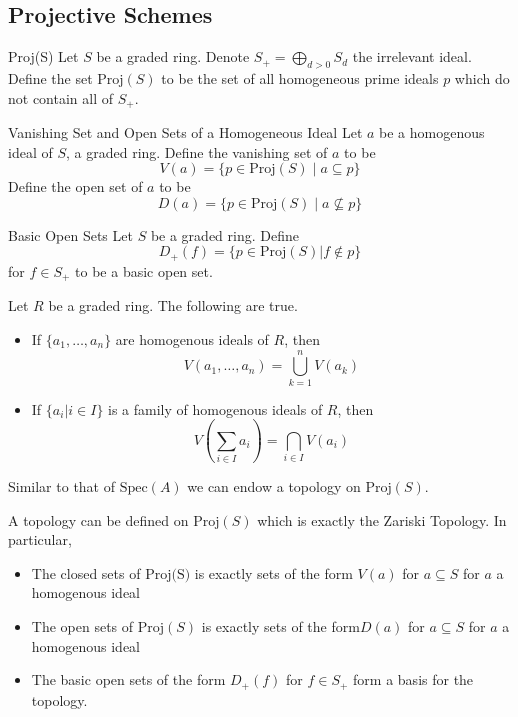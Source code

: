\documentclass[a4paper]{article}
\begin{document}
\subsection{Projective Schemes}
\begin{defn}{Proj(S)}{} Let $S$ be a graded ring. Denote $S_+=\bigoplus_{d>0}S_d$ the irrelevant ideal. Define the set $\text{Proj}(S)$ to be the set of all homogeneous prime ideals $p$ which do not contain all of $S_+$. 
\end{defn}

\begin{defn}{Vanishing Set and Open Sets of a Homogeneous Ideal}{} Let $a$ be a homogenous ideal of $S$, a graded ring. Define the vanishing set of $a$ to be $$V(a)=\{p\in\text{Proj}(S)\;|\;a\subseteq p\}$$ Define the open set of $a$ to be $$D(a)=\{p\in\text{Proj}(S)\;|\;a\not\subseteq p\}$$
\end{defn}

\begin{defn}{Basic Open Sets}{} Let $S$ be a graded ring. Define $$D_+(f)=\{p\in\text{Proj}(S)|f\notin p\}$$ for $f\in S_+$ to be a basic open set. 
\end{defn}

\begin{prp}{}{} Let $R$ be a graded ring. The following are true. 
\begin{itemize}
\item If $\{a_1,\dots,a_n\}$ are homogenous ideals of $R$, then $$V(a_1,\dots,a_n)=\bigcup_{k=1}^nV(a_k)$$
\item If $\{a_i|i\in I\}$ is a family of homogenous ideals of $R$, then $$V\left(\sum_{i\in I}a_i\right)=\bigcap_{i\in I}V(a_i)$$
\end{itemize}
\end{prp}

Similar to that of $\text{Spec}(A)$ we can endow a topology on $\text{Proj}(S)$. 

\begin{thm}{}{} A topology can be defined on $\text{Proj}(S)$ which is exactly the Zariski Topology. In particular, 
\begin{itemize}
\item The closed sets of $\text{Proj(S)}$ is exactly sets of the form $V(a)$ for $a\subseteq S$ for $a$ a homogenous ideal
\item The open sets of $\text{Proj}(S)$ is exactly sets of the form$ D(a)$ for $a\subseteq S$ for $a$ a homogenous ideal
\item The basic open sets of the form $D_+(f)$ for $f\in S_+$ form a basis for the topology. 
\end{itemize}
\end{thm}
\end{document}
